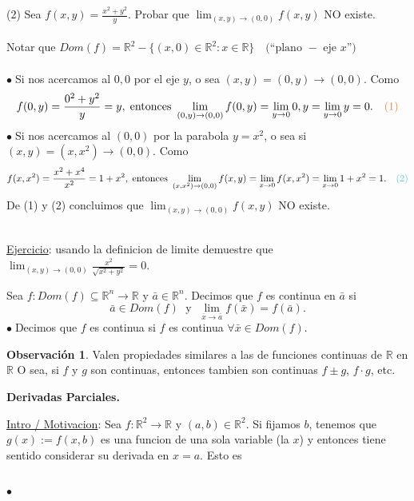\documentclass{article}
\theoremstyle{definition}
\newtheorem*{obs}{Observación}
\theoremstyle{remark}
\newcommand\bl{$\bullet\;$}
\begin{document}
\pagebreak 
\textcolor{verdep2}{(2)} Sea $f(x,y)=\frac{x^2+y^2}{y}$. Probar que $\lim_{(x,y)\to(0,0)}{f(x,y)}$ NO existe.
\\\\ 
Notar que $Dom(f)=\mathbb{R}^2-\big\{(x,0) \in \mathbb{R}^2 : x \in \mathbb{R}\big\} \quad \big(\text{``plano }- \text{ eje }x \text{''}\big)$ \\\\ 
\bl Si nos acercamos al $0,0$ por el eje $y$, o sea $(x,y)=(0,y) \to (0,0)$. Como \[
  f(0,y)=\frac{0^2+y^2}{y}=y, \; \text{entonces } \lim_{(0,y) \to (0,0)}{f(0,y)}=\lim_{y \to 0}{0,y}=\lim_{y \to 0}{y}=0. \quad \textcolor{rojop2}{\text{(1)}}
\]
\bl Si nos acercamos al $(0,0)$ por la parabola $y=x^2$, o sea si \mbox{$(x,y)=(x,x^2) \to (0,0)\text{. Como }$}\[
  f(x,x^2)=\frac{x^2+x^4}{x^2}=1+x^2, \; \text{entonces } \lim_{(x,x^2)\to(0,0)}{f(x,y)}=\lim_{x\to0}{f(x,x^2)}=\lim_{x\to 0}{1+x^2}=1. \quad \textcolor{verdep2}{\text(2)}
\]
De \textcolor{rojop2}{(1)} y \textcolor{verdep2}{(2)} concluimos que $\lim_{(x,y)\to(0,0)}{f(x,y)}$ NO existe.
\begin{figure}[h]
\centering
\def\svgwidth{0.35\textwidth}

\end{figure}\\
\underline{Ejercicio}: usando la definicion de limite demuestre que \mbox{$\lim_{(x,y)\to(0,0)}{\frac{x^2}{\sqrt{x^2+y^2}}}=0$.} 
\begin{defi}[Continuidad] Sea $f : Dom(f) \subseteq \mathbb{R}^n \to \mathbb{R}$ y $\bar{a} \in \mathbb{R}^n$. Decimos que $f$ es continua en $\bar{a}$ si $$\bar{a} \in Dom(f) \; \text{ y } \; \lim_{\bar{x} \to \bar{a}}{f(\bar{x})}=f(\bar{a}).$$
  \bl Decimos que $f$ es continua si $f$ es continua $\forall \bar{x} \in Dom(f)$. 
\end{defi}
\begin{obs}
  Valen propiedades similares a las de funciones continuas de $\mathbb{R}$ en $\mathbb{R}$ O sea, si $f$ y $g$ son continuas, entonces tambien son continuas $f \pm g$, $f \cdot g$, etc.
\end{obs}
\pagebreak
\begin{center}
\textbf{Derivadas Parciales.}
\end{center}
\underline{Intro / Motivacion}: Sea $f : \mathbb{R}^2 \to \mathbb{R}$ y $(a,b) \in \mathbb{R}^2$. Si fijamos $b$, tenemos que $g(x):=f(x,b)$ es una funcion de una sola variable (la $x$) y entonces tiene sentido considerar su derivada en $x=a$. Esto es 
\begin{figure}[h]
\centering
\def\svgwidth{1\textwidth}

\end{figure} \; \\ \bl 
\end{document}
